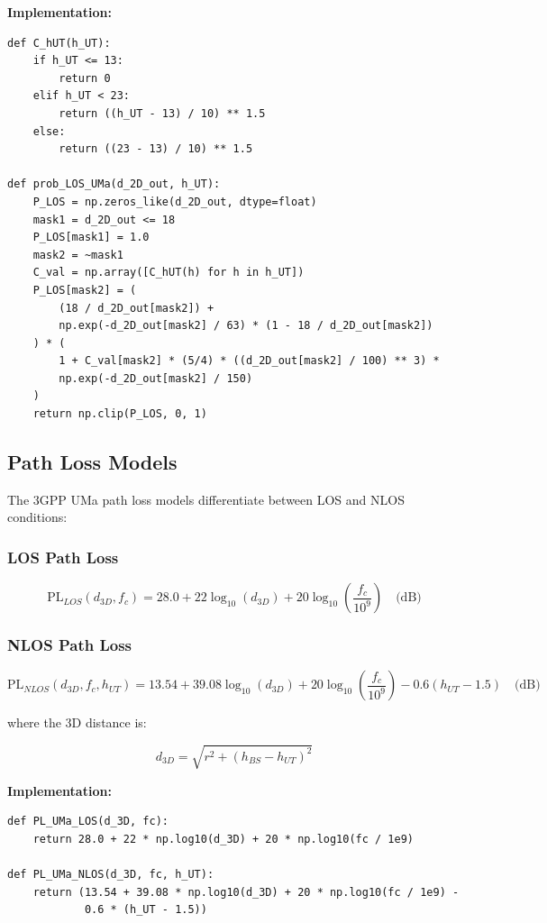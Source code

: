 \documentclass[12pt,a4paper]{article}
\begin{document}
\textbf{Implementation:}
\begin{lstlisting}[caption={LOS Probability Calculation}]
def C_hUT(h_UT):
    if h_UT <= 13:
        return 0
    elif h_UT < 23:
        return ((h_UT - 13) / 10) ** 1.5
    else:
        return ((23 - 13) / 10) ** 1.5

def prob_LOS_UMa(d_2D_out, h_UT):
    P_LOS = np.zeros_like(d_2D_out, dtype=float)
    mask1 = d_2D_out <= 18
    P_LOS[mask1] = 1.0
    mask2 = ~mask1
    C_val = np.array([C_hUT(h) for h in h_UT])
    P_LOS[mask2] = (
        (18 / d_2D_out[mask2]) +
        np.exp(-d_2D_out[mask2] / 63) * (1 - 18 / d_2D_out[mask2])
    ) * (
        1 + C_val[mask2] * (5/4) * ((d_2D_out[mask2] / 100) ** 3) *
        np.exp(-d_2D_out[mask2] / 150)
    )
    return np.clip(P_LOS, 0, 1)
\end{lstlisting}

\subsection{Path Loss Models}

The 3GPP UMa path loss models differentiate between LOS and NLOS conditions:

\subsubsection{LOS Path Loss}

\begin{equation}
\text{PL}_{LOS}(d_{3D}, f_c) = 28.0 + 22 \log_{10}(d_{3D}) + 20 \log_{10}\left(\frac{f_c}{10^9}\right) \quad \text{(dB)}
\end{equation}

\subsubsection{NLOS Path Loss}

\begin{equation}
\text{PL}_{NLOS}(d_{3D}, f_c, h_{UT}) = 13.54 + 39.08 \log_{10}(d_{3D}) + 20 \log_{10}\left(\frac{f_c}{10^9}\right) - 0.6(h_{UT} - 1.5) \quad \text{(dB)}
\end{equation}

where the 3D distance is:

\begin{equation}
d_{3D} = \sqrt{r^2 + (h_{BS} - h_{UT})^2}
\end{equation}

\textbf{Implementation:}
\begin{lstlisting}[caption={Path Loss Models}]
def PL_UMa_LOS(d_3D, fc):
    return 28.0 + 22 * np.log10(d_3D) + 20 * np.log10(fc / 1e9)

def PL_UMa_NLOS(d_3D, fc, h_UT):
    return (13.54 + 39.08 * np.log10(d_3D) + 20 * np.log10(fc / 1e9) - 
            0.6 * (h_UT - 1.5))
\end{lstlisting}
\end{document}
